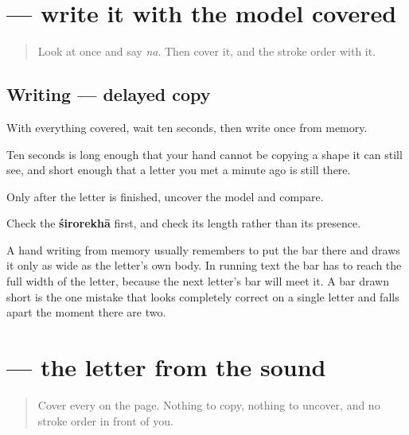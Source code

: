 \section[\texorpdfstring{\sk{न} (na)}{न (na)}]{ — write it with the model covered}

\label{lesson:SA-S02-delayed-copy}



\begin{quote}
Look at \textbf{} once and say \emph{na}. Then cover it, and the stroke order with it.
\end{quote}

\subsection*{Writing — delayed copy}

With everything covered, wait ten seconds, then write \textbf{} once from memory.

Ten seconds is long enough that your hand cannot be copying a shape it can still see, and short enough that a letter you met a minute ago is still there.

Only after the letter is finished, uncover the model and compare.

\begin{tcolorbox}[breakable,colback=teal!4,colframe=teal!35!black,title={Before you move on}]
Check the \textbf{śirorekhā} first, and check its length rather than its presence.

A hand writing from memory usually remembers to put the bar there and draws it only as wide as the letter's own body. In running text the bar has to reach the full width of the letter, because the next letter's bar will meet it. A bar drawn short is the one mistake that looks completely correct on a single letter and falls apart the moment there are two.
\end{tcolorbox}
\section[\texorpdfstring{\sk{न} (na)}{न (na)}]{ — the letter from the sound}

\label{lesson:SA-S02-dictation}



\begin{quote}
Cover every \textbf{} on the page. Nothing to copy, nothing to uncover, and no stroke order in front of you.
\end{quote}

